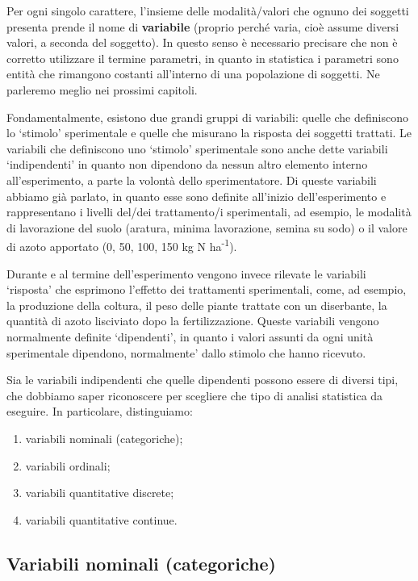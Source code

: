 \documentclass[
  12pt,
]{book}
\providecommand{\tightlist}{%
  \setlength{\itemsep}{0pt}\setlength{\parskip}{0pt}}
\begin{document}
Per ogni singolo carattere, l'insieme delle modalità/valori che ognuno dei soggetti presenta prende il nome di \textbf{variabile} (proprio perché varia, cioè assume diversi valori, a seconda del soggetto). In questo senso è necessario precisare che non è corretto utilizzare il termine parametri, in quanto in statistica i parametri sono entità che rimangono costanti all'interno di una popolazione di soggetti. Ne parleremo meglio nei prossimi capitoli.

Fondamentalmente, esistono due grandi gruppi di variabili: quelle che definiscono lo `stimolo' sperimentale e quelle che misurano la risposta dei soggetti trattati. Le variabili che definiscono uno `stimolo' sperimentale sono anche dette variabili `indipendenti' in quanto non dipendono da nessun altro elemento interno all'esperimento, a parte la volontà dello sperimentatore. Di queste variabili abbiamo già parlato, in quanto esse sono definite all'inizio dell'esperimento e rappresentano i livelli del/dei trattamento/i sperimentali, ad esempio, le modalità di lavorazione del suolo (aratura, minima lavorazione, semina su sodo) o il valore di azoto apportato (0, 50, 100, 150 kg N ha\textsuperscript{-1}).

Durante e al termine dell'esperimento vengono invece rilevate le variabili `risposta' che esprimono l'effetto dei trattamenti sperimentali, come, ad esempio, la produzione della coltura, il peso delle piante trattate con un diserbante, la quantità di azoto lisciviato dopo la fertilizzazione. Queste variabili vengono normalmente definite `dipendenti', in quanto i valori assunti da ogni unità sperimentale dipendono, normalmente' dallo stimolo che hanno ricevuto.

Sia le variabili indipendenti che quelle dipendenti possono essere di diversi tipi, che dobbiamo saper riconoscere per scegliere che tipo di analisi statistica da eseguire. In particolare, distinguiamo:

\begin{enumerate}
\def\labelenumi{\arabic{enumi}.}
\tightlist
\item
  variabili nominali (categoriche);
\item
  variabili ordinali;
\item
  variabili quantitative discrete;
\item
  variabili quantitative continue.
\end{enumerate}

\hypertarget{variabili-nominali-categoriche}{%
\subsection{Variabili nominali (categoriche)}\label{variabili-nominali-categoriche}}
\end{document}
